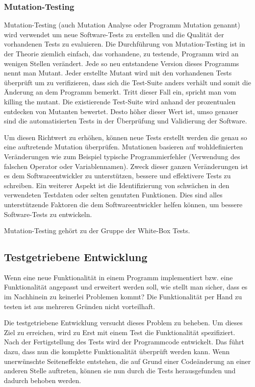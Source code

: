 \subsubsection{Mutation-Testing}\label{mutation-testing}

Mutation-Testing (auch Mutation Analyse oder Programm Mutation genannt) wird verwendet um neue Software-Tests zu erstellen und die Qualität der vorhandenen Tests zu evaluieren. Die Durchführung von Mutation-Testing ist in der Theorie ziemlich einfach, das vorhandene, zu testende, Programm wird an wenigen Stellen verändert. Jede so neu entstandene Version dieses Programms nennt man Mutant. Jeder erstellte Mutant wird mit den vorhandenen Tests überprüft um zu verifizieren, dass sich die Test-Suite anders verhält und somit die Änderung an dem Programm bemerkt. Tritt dieser Fall ein, spricht man vom \dq{}killing the mutant\dq{}. Die existierende Test-Suite wird anhand der prozentualen entdecken von Mutanten bewertet. Desto höher dieser Wert ist, umso genauer sind die automatisierten Tests in der Überprüfung und Validierung der Software. 

Um diesen Richtwert zu erhöhen, können neue Tests erstellt werden die genau so eine auftretende Mutation überprüfen. Mutationen basieren auf wohldefinierten Veränderungen wie zum Beispiel typische Programmierfehler (Verwendung des falschen Operator oder Variablennamen). Zweck dieser ganzen Veränderungen ist es dem Softwareentwickler zu unterstützen, bessere und effektivere Tests zu schreiben. Ein weiterer Aspekt ist die Identifizierung von schwächen in den verwendeten Testdaten oder selten genutzten Funktionen. Dies sind alles unterstützende Faktoren die dem Softwareentwickler helfen können, um bessere Software-Tests zu entwickeln.

Mutation-Testing gehört zu der Gruppe der White-Box Tests.

\subsection{Testgetriebene Entwicklung}
Wenn eine neue Funktionalität in einem Programm implementiert bzw. eine Funktionalität angepasst und erweitert werden soll, wie stellt man sicher, dass es im Nachhinein
zu keinerlei Problemen kommt? Die Funktionalität per Hand zu testen ist aus mehreren Gründen nicht vorteilhaft.

Die testgetriebene Entwicklung versucht dieses Problem zu beheben. Um dieses Ziel zu erreichen, wird zu Erst mit einem Test die Funktionalität spezifiziert. Nach der
Fertigstellung des Tests wird der Programmcode entwickelt. Das führt dazu, dass nun die komplette Funktionalität überprüft werden kann. Wenn unerwünschte Seiteneffekte 
entstehen, die auf Grund einer Codeänderung an einer anderen Stelle auftreten, können sie nun durch die Tests herausgefunden und dadurch
behoben werden.

